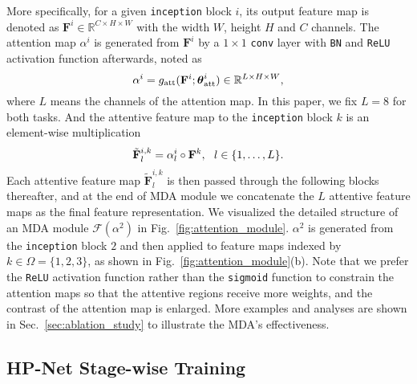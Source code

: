 \documentclass[10pt,twocolumn,letterpaper]{article}
\begin{document}
More specifically, for a given \texttt{inception} block $i$, its output feature map is denoted as $\mathbf{F}^i \in \mathbb{R}^{C \times H \times W}$ with the width $W$, height $H$ and $C$ channels.
%
The attention map $\alpha^i$ is generated from $\mathbf{F}^i$ by a $1\times1$ \texttt{conv} layer with \texttt{BN} and \texttt{ReLU} activation function afterwards, noted as
%
\begin{equation}
\label{eq:attention_map}
\vspace{-1pt}
\alpha^i = g_\mathrm{att}(\mathbf{F}^i; \boldsymbol\theta^i_{\mathrm{att}}) \in \mathbb{R}^{L\times H \times W},
\vspace{-1pt}
\end{equation}
%
where $L$ means the channels of the attention map.
%
In this paper, we fix $L=8$ for both tasks.
%
And the attentive feature map to the \texttt{inception} block $k$ is an element-wise multiplication
%
\begin{equation}
\label{eq:attentive_features}
\vspace{-1pt}
\tilde{\mathbf{F}}^{i,k}_l = \alpha^i_l \circ \mathbf{F}^{k}, ~~l\in\lbrace1,\ldots,L\rbrace.
\vspace{-1pt}
\end{equation}
%
Each attentive feature map $\tilde{\mathbf{F}}^{i,k}_l$ is then passed through the following blocks thereafter, and at the end of MDA module we concatenate the $L$ attentive feature maps as the final feature representation.
%
We visualized the detailed structure of an MDA module $\mathcal{F}(\alpha^2)$ in Fig.~\ref{fig:attention_module}.
%
$\alpha^2$ is generated from the \texttt{inception} block $2$ and then applied to feature maps indexed by $k\in\Omega=\{1,2,3\}$, as shown in Fig.~\ref{fig:attention_module}(b).
%
Note that we prefer the \texttt{ReLU} activation function rather than the \texttt{sigmoid} function to constrain the attention maps so that the attentive regions receive more weights, and the contrast of the attention map is enlarged.
%
More examples and analyses are shown in Sec.~\ref{sec:ablation_study} to illustrate the MDA's effectiveness.



\subsection{HP-Net Stage-wise Training}
\label{subsec:stage_wise_training}
\end{document}
